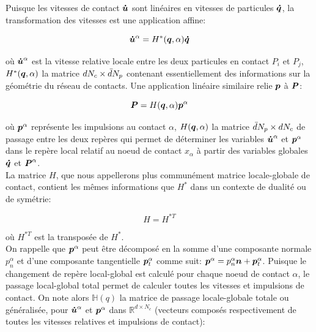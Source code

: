 Puisque les vitesses de contact $\boldsymbol{\dot{u}}$ sont linéaires en vitesses de particules $\boldsymbol{\dot{q}}$, la transformation des vitesses est une application affine:

\begin{equation}
\boldsymbol{\dot{u}}^{\alpha} = H^{*}(\boldsymbol{q},\alpha) \boldsymbol{\dot{q}}
\label{14}
\end{equation}

où $\boldsymbol{\dot{u}}^{\alpha}$ est la vitesse relative locale entre les deux particules en contact $P_i$ et $P_j$, $H^{*}(\boldsymbol{q},\alpha)$ la matrice $d N_c \times \Bar{d} N_p$ contenant essentiellement des informations sur la géométrie du réseau de contacts. Une application linéaire similaire relie $\boldsymbol{p}$ à $\boldsymbol{P}$:

\begin{equation}
\boldsymbol{P} = H(\boldsymbol{q},\alpha) \boldsymbol{p}^{\alpha}
\label{15}
\end{equation}

où $\boldsymbol{p}^{\alpha}$ représente les impulsions au contact $\alpha$, $H(\boldsymbol{q},\alpha)$ la matrice $\Bar{d} N_p \times d N_c$ de passage entre les deux repères qui permet de déterminer les variables $\boldsymbol{\dot{u}}^{\alpha}$ et $\boldsymbol{p}^{\alpha}$ dans le repère local relatif au noeud de contact $x_{\alpha}$ à partir des variables globales $\boldsymbol{\dot{q}}$ et $\boldsymbol{P}^{\alpha}$.\\ 
La matrice $H$, que nous appellerons plus communément matrice locale-globale de contact, contient les mêmes informations que $H^*$ dans un contexte de dualité ou de symétrie:
 
 \begin{equation}
H = H^{*T}
\label{16}
\end{equation}

\noindent où $H^{*T}$ est la transposée de $H^*$.\\
On rappelle que $\boldsymbol{p}^{\alpha}$ peut être décomposé en la somme d'une composante normale $p^{\alpha}_n$ et d'une composante tangentielle $\boldsymbol{p}^{\alpha}_t$ comme suit:
$\boldsymbol{p}^{\alpha} = p^{\alpha}_n \boldsymbol{n} + \boldsymbol{p}^{\alpha}_t$. Puisque le changement de repère local-global est calculé pour chaque noeud de contact $\alpha$, le passage local-global total permet de calculer toutes les vitesses et impulsions de contact. On note alors $\mathbb{H}(q)$ la matrice de passage locale-globale totale ou généralisée, pour $\boldsymbol{\dot{u}}^{\alpha}$ et $\boldsymbol{p}^{\alpha}$ dans $\mathbb{R}^{d \times N_c}$ (vecteurs composés respectivement de toutes les vitesses relatives et impulsions de contact):


